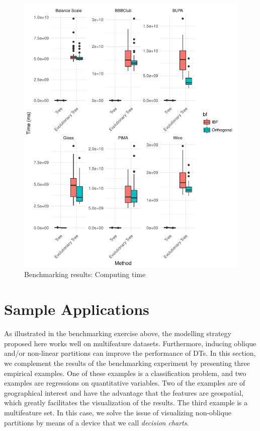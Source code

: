\documentclass[]{elsarticle} %
\makeatletter
\def\maxwidth{\ifdim\Gin@nat@width>\linewidth\linewidth
\else\Gin@nat@width\fi}
\let\Oldincludegraphics\includegraphics
\renewcommand{\includegraphics}[1]{\Oldincludegraphics[width=\maxwidth]{#1}}
\makeatother
\begin{document}
\begin{figure}[htbp]
\centering
\includegraphics{Trees_with_Base_Functions_files/figure-latex/fig10-time-benchmark-results-1.pdf}
\caption{\label{fig:fig10-time-benchmark-results}Benchmarking results:
Computing time}
\end{figure}

\hypertarget{sample-applications}{\section{Sample
Applications}\label{sample-applications}}

As illustrated in the benchmarking exercise above, the modelling
strategy proposed here works well on multifeature datasets. Furthermore,
inducing oblique and/or non-linear partitions can improve the
performance of DTs. In this section, we complement the results of the
benchmarking experiment by presenting three empirical examples. One of
these examples is a classification problem, and two examples are
regressions on quantitative variables. Two of the examples are of
geographical interest and have the advantage that the features are
geospatial, which greatly facilitates the visualization of the results.
The third example is a multifeature set. In this case, we solve the
issue of visualizing non-oblique partitions by means of a device that we
call \emph{decision charts}.
\end{document}
